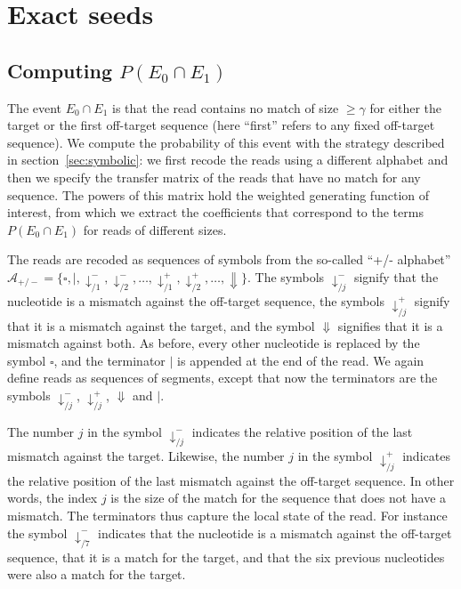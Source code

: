 \documentclass{article}
\begin{document}
\section{Exact seeds}

\subsection{Computing $P(E_0 \cap E_1)$}
\label{sec:cPE0E1}

The event $E_0 \cap E_1$ is that the read contains no match of size $\geq
\gamma$ for either the target or the first off-target sequence (here
``first'' refers to any fixed off-target sequence). We compute the
probability of this event with the strategy described in
section~\ref{sec:symbolic}: we first recode the reads using a different
alphabet and then we specify the transfer matrix of the reads that have no
match for any sequence. The powers of this matrix hold the weighted
generating function of interest, from which we extract the coefficients
that correspond to the terms $P(E_0 \cap E_1)$ for reads of different
sizes.

The reads are recoded as sequences of symbols from the so-called ``+/-
alphabet'' $\mathcal{A}_{+/-} = \{\square, |, \downarrow_{/1}^-,
\downarrow_{/2}^-, \ldots, \downarrow_{/1}^+, \downarrow_{/2}^+, \ldots,
\Downarrow\}$. The symbols $\downarrow_{/j}^-$ signify that the nucleotide
is a mismatch against the off-target sequence, the symbols
$\downarrow_{/j}^+$ signify that it is a mismatch against the target, and
the symbol $\Downarrow$ signifies that it is a mismatch against both. As
before, every other nucleotide is replaced by the symbol $\square$, and
the terminator $|$ is appended at the end of the read. We again define
reads as sequences of segments, except that now the terminators are the
symbols $\downarrow_{/j}^-$, $\downarrow_{/j}^+$, $\Downarrow$ and $|$.

The number $j$ in the symbol $\downarrow_{/j}^-$ indicates the relative
position of the last mismatch against the target. Likewise, the number $j$
in the symbol $\downarrow_{/j}^+$ indicates the relative position of the
last mismatch against the off-target sequence. In other words, the index
$j$ is the size of the match for the sequence that does not have a
mismatch. The terminators thus capture the local state of the read. For
instance the symbol $\downarrow_{/7}^-$ indicates that the nucleotide is a
mismatch against the off-target sequence, that it is a match for the
target, and that the six previous nucleotides were also a match for the
target.
\end{document}
